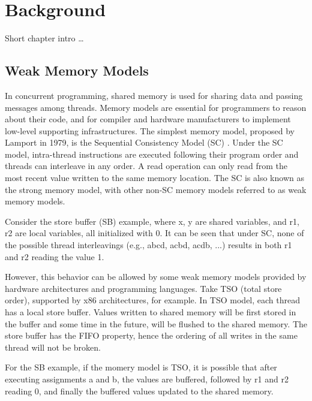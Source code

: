\chapter{\label{cha:title}Background}

Short chapter intro \ldots

\section{Weak Memory Models}

In concurrent programming, shared memory is used for sharing data and passing messages among threads. Memory models are essential for programmers to reason about their code, and for compiler and hardware manufacturers to implement low-level supporting infrastructures. The simplest memory model, proposed by Lamport\cite{SC} in 1979, is the Sequential Consistency Model (SC) . Under the SC model, intra-thread instructions are executed following their program order and threads can interleave in any order. A read operation can only read from the most recent value written to the same memory location. The SC is also known as the strong memory model, with other non-SC memory models referred to as weak memory models.

Consider the store buffer (SB) example, where x, y are shared variables, and r1, r2 are local variables, all initialized with 0. It can be seen that under SC, none of the possible thread interleavings (e.g., abcd, acbd, acdb, ...) results in both r1 and r2 reading the value 1.


However, this behavior can be allowed by some weak memory models provided by hardware architectures and programming languages. Take TSO (total store order)\cite{TSO}, supported by x86 architectures, for example. In TSO model, each thread has a local store buffer. Values written to shared memory will be first stored in the buffer and some time in the future, will be flushed to the shared memory. The store buffer has the FIFO property, hence the ordering of all writes in the same thread will not be broken. 

For the SB example, if the momery model is TSO, it is possible that after executing assignments a and b, the values are buffered, followed by r1 and r2 reading 0, and finally the buffered values updated to the shared memory. 

